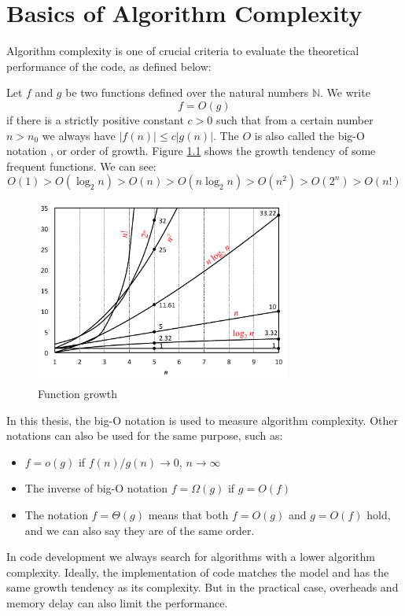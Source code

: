 
\chapter{Basics of Algorithm Complexity\label{chpt:computing-performance}}

Algorithm complexity is one of crucial criteria to evaluate the theoretical
performance of the code, as defined below:

Let $f$ and $g$ be two functions defined over the natural numbers
$\mathbb{N}$. We write
\begin{equation}
f=O(g)
\end{equation}
if there is a strictly positive constant $c>0$ such that from a certain
number $n>n_{0}$ we always have $\left|f(n)\right|\leq c\left|g(n)\right|$.
The $O$ is also called the big-O notation \citep{Complexity}, or
order of growth. Figure \ref{fig:order-of-growth} shows the growth
tendency of some frequent functions. We can see:
\begin{equation}
O(1)>O(\log_{2}n)>O(n)>O(n\log_{2}n)>O(n^{2})>O(2^{n})>O(n!)
\end{equation}

\begin{figure}[h]
\begin{centering}
\includegraphics[width=0.75\textwidth]{_figure/orders-of-growth}
\par\end{centering}
\caption{Function growth\label{fig:order-of-growth}}
\end{figure}

In this thesis, the big-O notation is used to measure algorithm complexity.
Other notations can also be used for the same purpose, such as:
\begin{itemize}
\item $f=o(g)$ if $f(n)/g(n)\rightarrow0$, $n\rightarrow\infty$
\item The inverse of big-O notation $f=\Omega(g)$ if $g=O(f)$
\item The notation $f=\Theta(g)$ means that both $f=O(g)$ and $g=O(f)$
hold, and we can also say they are of the same order.
\end{itemize}
In code development we always search for algorithms with a lower algorithm
complexity. Ideally, the implementation of code matches the model
and has the same growth tendency as its complexity. But in the practical
case, overheads and memory delay can also limit the performance.
